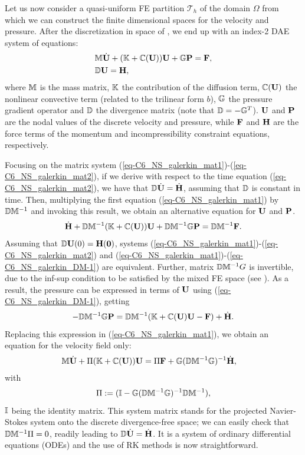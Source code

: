 Let us now consider a quasi-uniform FE partition $\mathcal{T}_h$ of the domain $\Omega$ from which we can construct the finite dimensional spaces for the velocity and pressure. After the discretization in space of , we end up with an index-2 DAE system of equations:
\begin{align}
\label{eq-C6_NS_galerkin_mat1}
&\M\dot{\U}+(\K+\C(\U))\U+\G\P=\F,\\
\label{eq-C6_NS_galerkin_mat2}
&\D\U= \H,
\end{align}
where $\M$ is the mass matrix, $\K$ the contribution of the diffusion term, $\C(\U)$ the nonlinear convective term (related to the trilinear form $b$), $\G$ the pressure gradient operator and $\D$ the divergence matrix (note that $\D=-\G^T$). $\U$ and $\P$ are the nodal values of the discrete velocity and pressure, while $\F$ and $\H$ are the force terms of the momentum and incompressibility constraint equations, respectively. 

Focusing on the matrix system (\ref{eq-C6_NS_galerkin_mat1})-(\ref{eq-C6_NS_galerkin_mat2}), if we derive with respect to the time equation (\ref{eq-C6_NS_galerkin_mat2}), we have that $\D\dot{\U}= \dot{\H}$, assuming that $\D$ is constant in time. Then, multiplying the first equation (\ref{eq-C6_NS_galerkin_mat1}) by $\D\M^{-1}$ and invoking this result, we obtain an alternative equation for $\U$ and $\P$.
\begin{equation}
\label{eq-C6_NS_galerkin_DM-1}
\dot{\H} + \D\M^{-1}(\K+\C(\U))\U+\D\M^{-1}\G\P=\D\M^{-1}\F.
\end{equation}
Assuming that $\D\U(0) = \H(0)$, systems (\ref{eq-C6_NS_galerkin_mat1})-(\ref{eq-C6_NS_galerkin_mat2}) and (\ref{eq-C6_NS_galerkin_mat1})-(\ref{eq-C6_NS_galerkin_DM-1}) are equivalent. Further, matrix $\D\M^{-1} G$ is invertible, due to the inf-sup condition to be satisfied by the mixed FE space (see \cite{elman_finite_2005}). As a result, the pressure can be expressed in terms of $\U$ using (\ref{eq-C6_NS_galerkin_DM-1}), getting
\begin{equation}
\label{eq-C6_NS_galerkin_DM-2}
-\D\M^{-1}\G\P=\D\M^{-1}(\K+\C(\U)\U- \F) + \dot{\H}.
\end{equation}
Replacing this expression in (\ref{eq-C6_NS_galerkin_mat1}), we obtain an equation for the velocity field only:
\begin{align}
\label{eq-C6_NS_galerkin_ou}
&\M\dot{\U}+ \Pi(\K+\C(\U))\U  = \Pi\F + \G(\D\M^{-1}\G)^{-1} \dot{\H},
\end{align}
with
$$\Pi := (\I - \G(\D\M^{-1}\G)^{-1}\D\M^{-1}),$$ 
$\I$ being the identity matrix. This system matrix stands for the projected Navier-Stokes system onto the discrete divergence-free space; we can easily check that $\D\M^{-1}\Pi = 0$, readily leading to $\D \dot{\U} = \dot{\H}$. It is a system of ordinary differential equations (ODEs) and the use of RK methods is now straightforward. 

